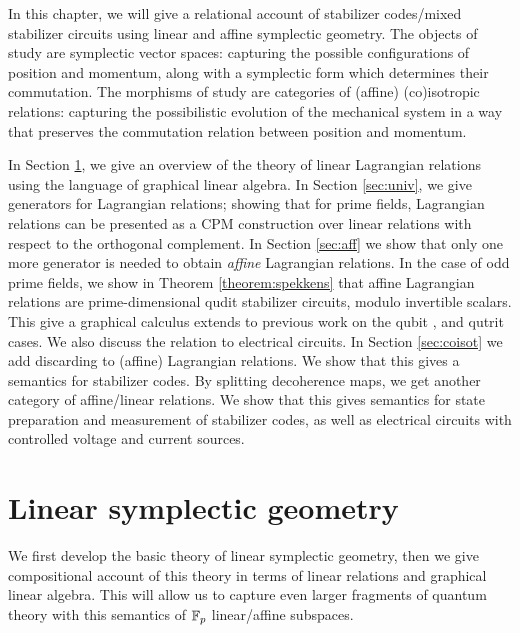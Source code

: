 
In this chapter, we will give a relational account of stabilizer codes/mixed stabilizer circuits using linear and affine symplectic geometry.
The objects of study are symplectic vector spaces: capturing the possible configurations of position and momentum, along with a symplectic form which determines their commutation. The morphisms of study  are categories of (affine) (co)isotropic relations: capturing the possibilistic evolution of the mechanical system in a way that preserves the commutation relation between position and momentum.

In Section \ref{sec:sym}, we give an overview of the theory of linear Lagrangian relations using the language of graphical linear algebra. In Section \ref{sec:univ}, we give generators for Lagrangian relations; showing that for prime fields, Lagrangian relations can be presented as a CPM construction over linear relations with respect to the orthogonal complement.
In Section \ref{sec:aff} we show that only one more generator is needed to obtain {\em affine} Lagrangian relations.  In the case of odd prime fields, we show in Theorem \ref{theorem:spekkens} that affine Lagrangian relations are prime-dimensional qudit stabilizer circuits, modulo invertible scalars.  This give a graphical calculus extends to previous work on the qubit \cite{backensspek}, and qutrit \cite{qutrit} cases.  We also discuss the relation to electrical circuits.
In Section \ref{sec:coisot} we add discarding to (affine) Lagrangian relations.  We show that this gives a semantics for stabilizer codes.  By splitting decoherence maps, we get another category of affine/linear relations.  We show that this gives semantics for state preparation and measurement of stabilizer codes, as well as electrical circuits with controlled voltage and current sources.

\section{Linear symplectic geometry}
\label{sec:sym}

We first develop the basic theory of linear symplectic geometry, then we give compositional account of this theory in terms of linear relations and graphical linear algebra. This will allow us to capture even larger fragments of quantum theory with this semantics of  $\mathbb{F}_p$ linear/affine subspaces. 


